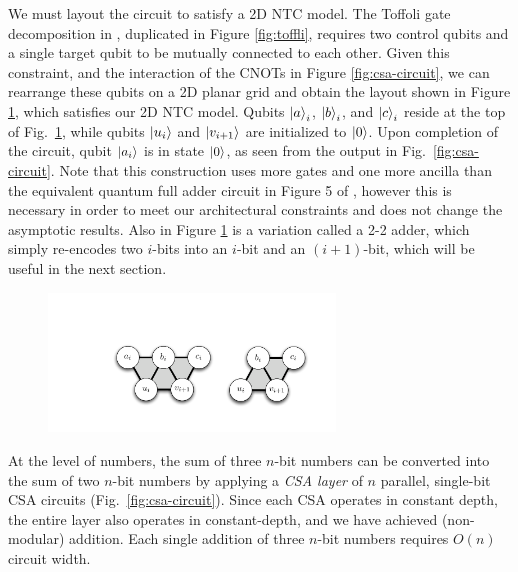 \documentclass[twoside]{article}
\begin{document}
We must layout the circuit to satisfy a 2D NTC model.
The Toffoli gate decomposition in \cite{Amy2012}, duplicated in
Figure \ref{fig:toffli}, requires two control
qubits and a single target qubit to be
mutually connected to each other. Given this constraint, and the
interaction of the CNOTs in Figure \ref{fig:csa-circuit}, we can
rearrange these qubits on a 2D planar grid and obtain the layout shown
in Figure \ref{fig:csa-3-2}, which satisfies our 2D NTC model.
Qubits $\left\vert{a}\right\rangle_i$, $\left\vert{b}\right\rangle_i$, and $\left\vert{c}\right\rangle_i$ reside at the top of Fig.~\ref{fig:csa-3-2}, while qubits $\left\vert{u_i}\right\rangle$ and $\left\vert{v_{i+1}}\right\rangle$ are initialized to $\left\vert{0}\right\rangle$.
Upon completion of the circuit, qubit $\left\vert{a_i}\right\rangle$ is in state $\left\vert{0}\right\rangle$, as seen from the output in Fig.~\ref{fig:csa-circuit}. 
Note that this construction uses more gates and one more ancilla than the equivalent
quantum full adder circuit in Figure 5 of \cite{Gossett1998}, however this
is necessary in order to meet our architectural constraints and does not change the
asymptotic results.
Also in Figure \ref{fig:csa-3-2}
is a variation called a 2-2 adder, which simply re-encodes two $i$-bits
into an $i$-bit and an $(i+1)$-bit, which will be useful in the next section.

\begin{figure}[b!]
\begin{center}
\includegraphics[width=3in]{./csa-32-22.pdf}
\end{center}
\label{fig:csa-3-2}
\end{figure}

At the level of numbers, the sum of three $n$-bit numbers can be converted into
the sum of two $n$-bit numbers by applying a \emph{CSA layer} of
$n$ parallel, single-bit
CSA circuits (Fig.~\ref{fig:csa-circuit}). Since each CSA operates in constant depth, the entire layer also
operates in constant-depth, and we have achieved (non-modular) addition.
%
Each single addition of three $n$-bit numbers requires $O(n)$ circuit width.
\end{document}
